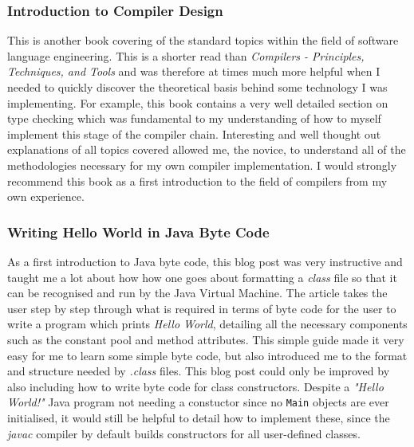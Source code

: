 \documentclass[a4paper, 11pt]{article}
\begin{document}
\subsubsection{Introduction to Compiler Design \cite{ItCD}}
This is another book covering of the standard topics within the field of software language engineering. This is a shorter read than \textit{Compilers - Principles, Techniques, and Tools} and was therefore at times much more helpful when I needed to quickly discover the theoretical basis behind some technology I was implementing. For example, this book contains a very well detailed section on type checking which was fundamental to my understanding of how to myself implement this stage of the compiler chain. Interesting and well thought out explanations of all topics covered allowed me, the novice, to understand all of the methodologies necessary for my own compiler implementation. I would strongly recommend this book as a first introduction to the field of compilers from my own experience.

\subsubsection{Writing Hello World in Java Byte Code\cite{HelloWorld}}
As a first introduction to Java byte code, this blog post was very instructive and taught me a lot about how how one goes about formatting a \textit{class} file so that it can be recognised and run by the Java Virtual Machine. The article takes the user step by step through what is required in terms of byte code for the user to write a program which prints \textit{Hello World}, detailing all the necessary components such as the constant pool and method attributes. This simple guide made it very easy for me to learn some simple byte code, but also introduced me to the format and structure needed by \textit{.class} files. This blog post could only be improved by also including how to write byte code for class constructors. Despite a \textit{"Hello World!"} Java program not needing a constuctor since no \texttt{Main} objects are ever initialised, it would still be helpful to detail how to implement these, since the \textit{javac} compiler by default builds constructors for all user-defined classes. 
\end{document}
